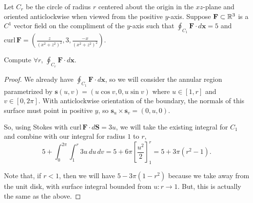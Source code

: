 \documentclass[../hw10]{subfiles}
\begin{document}
\begin{problem}[3]
Let $C_r$ be the circle of radius  $r$ centered about the origin in the $xz$-plane  and oriented anticlockwise when viewed from the positive $y$-axis.
Suppose $\mathbf{F}\subset \mathbb{R}^3$ is a $C^1$ vector field on the compliment of the  $y$-axis such that $\oint_{C_{1}}\mathbf{F}\cdot d\mathbf{x} = 5$ and $\text{curl}\,\mathbf{F} = \left(\frac{z}{{(x^2 + z^2)}^2},3,\frac{-x}{{(x^2 + z^2)}^2}\right)$.

Compute $\forall r$, $\oint_{C_r} \mathbf{F}\cdot d\mathbf{x}$.
\end{problem}
\begin{proof}
	We already have $\oint_{C_1}\mathbf{F}\cdot d\mathbf{x}$, so we will consider the annular region parametrized by $\mathbf{s}(u,v) = (u\cos{v},0,u\sin{v})$ where $u\in [1,r]$ and $v\in [0,2\pi]$.
	With anticlockwise orientation of the boundary, the normals of this surface must point in positive $y$, so  $\mathbf{s}_u\times \mathbf{s}_v = (0,u,0)$.

	So, using Stokes with $\text{curl}\,\mathbf{F}\cdot d\mathbf{S} = 3u$, we will take the existing integral for $C_1$ and combine with our integral for radius  $1$ to  $r$,  \[
		5+\int_{0}^{2\pi} \int_{1}^{r} 3u \,du \,dv
		= 5 + 6\pi \left[ \frac{u^2}{2} \right]_1^r
		= 5+3\pi (r^2-1)
		.\]

	Note that, if $r<1$, then we will have $5-3\pi(1-r^2)$ because we take away from the unit disk, with surface integral bounded from $u : r \to 1$.
	But, this is actually the same as the above.
\end{proof}
\end{document}
